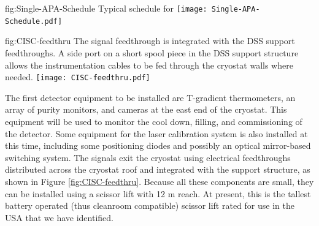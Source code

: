 \begin{dunefigure}
{fig:Single-APA-Schedule}
{Typical  schedule for }
\texttt{[image: Single-APA-Schedule.pdf]}
\end{dunefigure}

\begin{dunefigure}{fig:CISC-feedthru}
{The signal feedthrough is integrated with the DSS support feedthroughs. A side port on a short spool piece in the DSS support structure allows the instrumentation cables to be fed through the cryostat walls where needed.}
\texttt{[image: CISC-feedthru.pdf]}
\end{dunefigure}



The first detector equipment to be installed are  T-gradient thermometers,  an array of purity monitors, and cameras at the east end of the cryostat. This equipment will be used to monitor the cool down, filling, and commissioning of the detector. Some equipment for the laser calibration system is also installed at this time,  including some positioning diodes and possibly an optical mirror-based switching system.  The signals exit the cryostat using electrical feedthroughs distributed across the cryostat roof and integrated with the  support structure, as shown in Figure \ref{fig:CISC-feedthru}. Because all these components are small, they can be installed using a scissor lift with 12 \si{m} reach. At present, this is the tallest battery operated (thus cleanroom compatible) scissor lift rated for use in the USA that we have identified.

